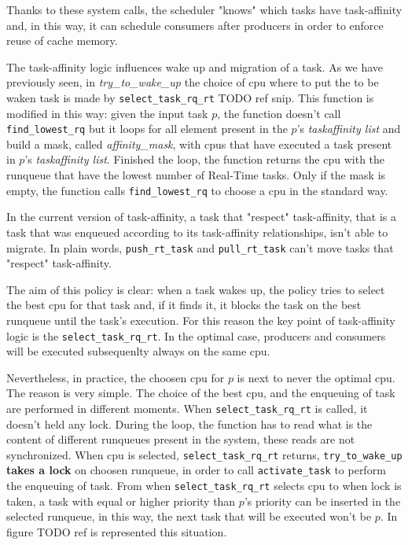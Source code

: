 Thanks to these system calls, the scheduler "knows" which tasks have task-affinity and, in this way, it can schedule consumers after producers in order to 
enforce reuse of cache memory.

The task-affinity logic influences wake up and migration of a task. As we have previously seen, in \textit{try\_to\_wake\_up} the choice of cpu where to 
put the to be waken task is made by \texttt{select\_task\_rq\_rt} TODO ref snip. This function is modified in this way: given the input task $p$, the 
function doesn't call \texttt{find\_lowest\_rq} but it loops for all element present in the $p$'s \textit{taskaffinity list} and build a mask, called 
\textit{affinity\_mask}, with cpus that have executed a task present in $p$'s \textit{taskaffinity list}. Finished the loop, the function returns the cpu 
with the runqueue that have the lowest number of Real-Time tasks. Only if the mask is empty, the function calls \texttt{find\_lowest\_rq} to choose a cpu
in the standard way. 

In the current version of task-affinity, a task that "respect" task-affinity, that is a task that was enqueued according to its task-affinity 
relationships, isn't able to migrate. In plain words, \texttt{push\_rt\_task} and \texttt{pull\_rt\_task} can't move tasks that "respect" task-affinity.

The aim of this policy is clear: when a task wakes up, the policy tries to select the best cpu for that task and, if it finds it, it blocks the task on the 
best runqueue until the task's execution. For this reason the key point of task-affinity logic is the \texttt{select\_task\_rq\_rt}. In the optimal case, 
producers and consumers will be executed subsequenlty always on the same cpu.

Nevertheless, in practice, the choosen cpu for $p$ is next to never the optimal cpu. The reason is very simple. The choice of the best 
cpu, and the enqueuing of task are performed in different moments. When \texttt{select\_task\_rq\_rt} is called, it doesn't held any lock. During the loop, 
the function has to read what is the content of different runqueues present in the system, these reads are not synchronized. When cpu is selected, 
\texttt{select\_task\_rq\_rt} returns, \texttt{try\_to\_wake\_up} \textbf{takes a lock} on choosen runqueue, in order to call \texttt{activate\_task} 
to perform the enqueuing of task. From when \texttt{select\_task\_rq\_rt} selects cpu to when lock is taken, a task with equal or higher priority than 
$p$'s priority can be inserted in the selected runqueue, in this way, the next task that will be executed won't be $p$. In figure TODO ref is represented 
this situation.

